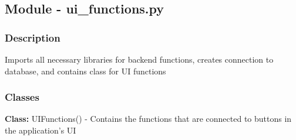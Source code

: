 \documentclass[12pt, titlepage]{article}
\begin{document}

    \newpage
    \subsection{Module - ui\_functions.py}

    \subsubsection{Description}
    Imports all necessary libraries for backend functions, creates connection to database, and contains class for UI functions
    
    \subsubsection{Classes}
    \textbf{Class:} UIFunctions() - Contains the functions that are connected to buttons in the application’s UI \\
    
\end{document}
